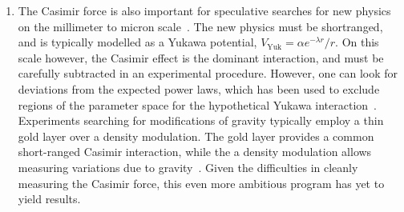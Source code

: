 \begin{enumerate}
\item The Casimir force is also important for speculative searches for new physics on the millimeter to micron
scale~\cite{Dimopoulos2003, Bezerra2011}.  The new physics must be shortranged, and is typically modelled as 
a Yukawa potential, $V_{\text{Yuk}}=\alpha e^{-\lambda r}/r$.  
On this scale however, the Casimir effect is the dominant interaction, and must be 
carefully subtracted in an experimental procedure.  However, one can look for deviations from the expected 
power laws, which has been used to exclude regions of the parameter space for the hypothetical
Yukawa interaction~\cite{Lamoreaux1997,Obrecht2007,Bezerra2011}.  
Experiments searching for modifications of gravity typically employ a thin gold layer over
a density modulation.  The gold layer provides a common short-ranged Casimir interaction, while the 
a density modulation allows measuring variations due to gravity~\cite{Sorrentino2009, Geraci2015}.
Given the difficulties in cleanly measuring the Casimir force, this even more ambitious program has yet 
to yield results.  
\end{enumerate}




